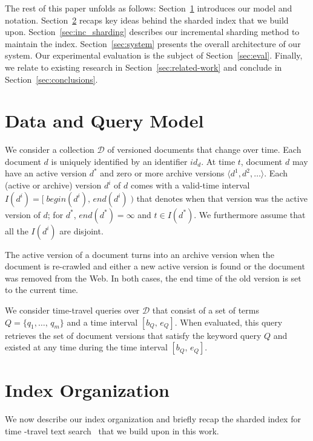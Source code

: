
The rest of this paper unfolds as follows: Section~\ref{sec:model}
introduces our model and
notation. Section~\ref{sec:index-organization} recaps key ideas behind
the sharded index that we build upon. Section~\ref{sec:inc_sharding}
describes our incremental sharding method to maintain the
index. Section~\ref{sec:system} presents the overall architecture of
our system. Our experimental evaluation is the subject of
Section~\ref{sec:eval}. Finally, we relate to existing research in
Section~\ref{sec:related-work} and conclude in
Section~\ref{sec:conclusions}.

\section{Data and Query Model}
\label{sec:model}

We consider a collection $\mathcal{D}$ of versioned documents that
change over time.  Each document $d$ is uniquely identified by an
identifier $id_{d}$.  At time $t$, document $d$ may have an active
version $d^*$ and zero or more archive versions $\langle d^{{1}},
d^{{2}}, \ldots \rangle$.  Each (active or archive) version $d^i$ of
$d$ comes with a valid-time interval $I(d^{i}) =
[\;begin(d^{i}),\,end(d^{i})\;)$ that denotes when that version was
the active version of $d$; for $d^*$, $end(d^*)=\infty$ and $t\in
I(d^*)$. We furthermore assume that all the $I(d^i)$ are disjoint.

The active version of a document turns into an archive version when
the document is re-crawled and either a new active version is found or
the document was removed from the Web. In both cases, the end time of
the old version is set to the current time.

We consider time-travel queries over $\mathcal{D}$ that consist of a
set of terms $Q = \{q_{1},\ldots,\,q_{m}\}$ and a time interval
$[b_{Q},\,e_{Q}]$. When evaluated, this query retrieves the set of
document versions that satisfy the keyword query $Q$ and existed at
any time during the time interval $[b_{Q},\,e_{Q}]$.


\section{Index Organization}
\label{sec:index-organization}

We now describe our index organization and briefly recap the sharded
index for time
-travel text search~\cite{aanand:sigir2011} that we
build upon in this work.

